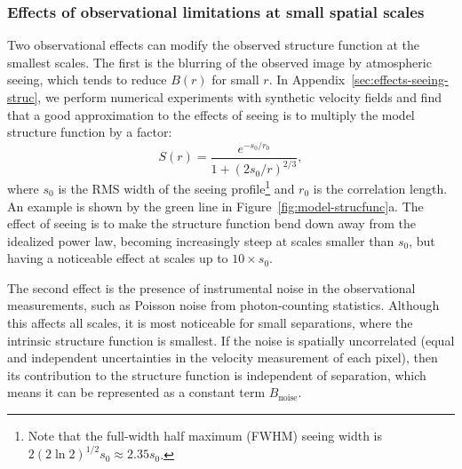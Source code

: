 \documentclass[fleqn,usenatbib, useAMS, a4paper]{mnras}
\newcommand\noise{\ensuremath{_{\text{noise}}}}
\begin{document}

\subsubsection{Effects of observational limitations at small spatial scales}
\label{sec:effect-observ-limit}

Two observational effects can modify the observed structure function at the smallest scales.
The first is the blurring of the observed image by atmospheric seeing,
which tends to reduce \(B(r)\) for small \(r\).
In Appendix~\ref{sec:effects-seeing-struc}, we perform numerical experiments
with synthetic velocity fields and find that
a good approximation to the effects of seeing is to multiply
the model structure function by a factor:
\begin{equation}\label{eq:ffs}
   S(r) = \frac{
    e^{-s_0 / r_0}
  }{
    1+(2s_0 / r)^{2 / 3}
  } ,
\end{equation}
where \(s_0\) is the RMS width of the seeing profile\footnote{%
  Note that the full-width half maximum (FWHM) seeing width is
  \(2 (2 \ln 2)^{1/2} s_0 \approx 2.35 s_0\).
}
and \(r_0\) is the correlation length.
An example is shown by the green line in Figure~\ref{fig:model-strucfunc}a.
The effect of seeing is to make the structure function 
bend down away from the idealized power law, 
becoming increasingly steep at scales smaller than \(s_0\),
but having a noticeable effect at scales up to \(10 \times s_0\).

The second effect is the presence of instrumental noise
in the observational measurements,
such as Poisson noise from photon-counting statistics. 
Although this affects all scales,
it is most noticeable for small separations,
where the intrinsic structure function is smallest.
If the noise is spatially uncorrelated
(equal and independent uncertainties in the velocity
measurement of each pixel),
then its contribution to the structure function is independent of separation,
which means it can be represented as a constant term \(B\noise\).
\end{document}
